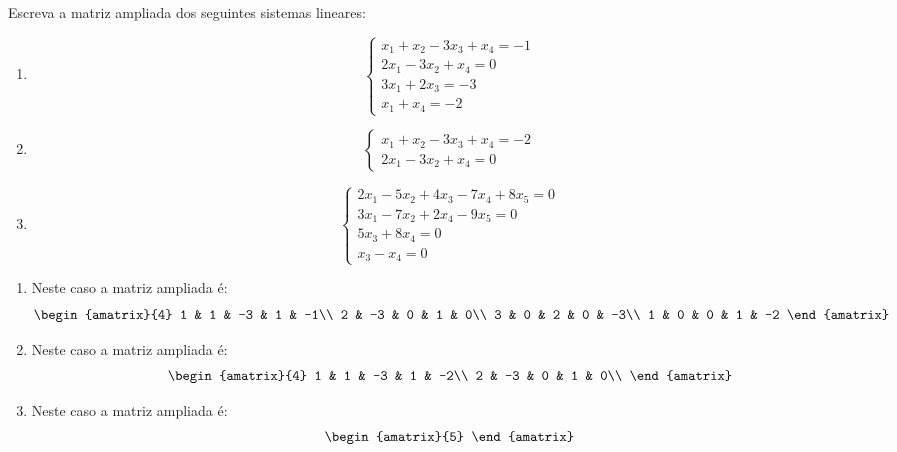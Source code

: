 \begin{exemplos}
    Escreva a matriz ampliada dos seguintes sistemas lineares:
    \begin{enumerate}[label={\arabic*})]
        \item \[\begin{cases} x_1 + x_2 - 3x_3 + x_4 = -1\\ 2x_1 - 3x_2 + x_4 = 0\\ 3x_1 + 2x_3 = -3\\ x_1 + x_4 = -2\end{cases}\]
        \item \[\begin{cases} x_1 + x_2 - 3x_3 + x_4 = -2\\ 2x_1 - 3x_2 + x_4 = 0\end{cases}\]
        \item \[\begin{cases} 2x_1 - 5x_2 + 4x_3 - 7x_4 + 8x_5 = 0\\ 3x_1 - 7x_2 + 2x_4 - 9x_5 = 0\\ 5x_3 + 8x_4 = 0\\ x_3 - x_4 = 0\end{cases}\]
    \end{enumerate}
    \begin{solucao}
        \begin{enumerate}[label={\arabic*})]
            \item Neste caso a matriz ampliada \'e:
                \[
                    \begin{amatrix}{4}
                        1 & 1 & -3 & 1 & -1\\
                        2 & -3 & 0 & 1 & 0\\
                        3 & 0 & 2 & 0 & -3\\
                        1 & 0 & 0 & 1 & -2
                    \end{amatrix}
                \]
            \item Neste caso a matriz ampliada \'e:
                \[
                    \begin{amatrix}{4}
                        1 & 1 & -3 & 1 & -2\\
                        2 & -3 & 0 & 1 & 0\\
                    \end{amatrix}
                \]
            \item Neste caso a matriz ampliada \'e:
                \[
                    \begin{amatrix}{5}

\end{amatrix}\]
\end{enumerate}
\end{solucao}
\end{exemplos}

